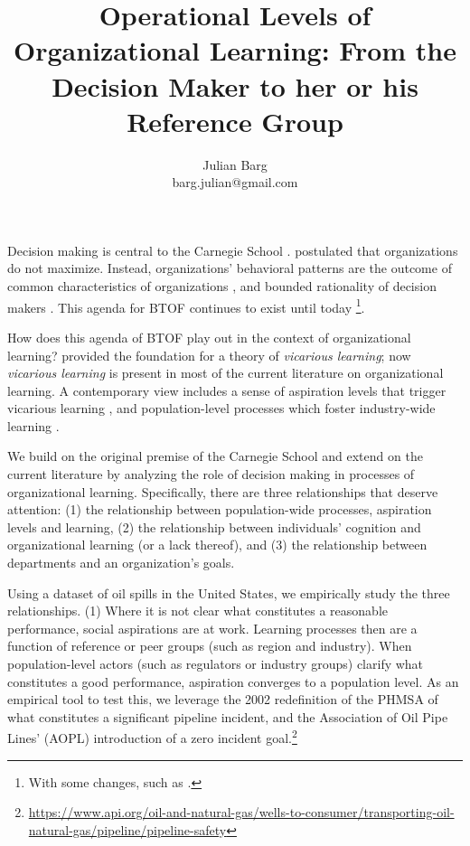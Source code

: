 \documentclass[12pt, man, natbib]{apa6}
\title{Operational Levels of Organizational Learning: From the Decision Maker to her or his Reference Group}
\author{Julian Barg\\barg.julian@gmail.com}
\affiliation{Ivey Business School}
\begin{document}
\maketitle

\singlespacing

\section{}	
	Decision making is central to the Carnegie School \citep{Gavetti2012}. \citet{Cyert1963} postulated that organizations do not maximize. Instead, organizations' behavioral patterns are the outcome of common characteristics of organizations \citep[e.g., the existence of routines or performance programs, see][]{March1958}, and bounded rationality of decision makers \citep{Gavetti2012}. This agenda for BTOF continues to exist until today \footnote{With some changes, such as \citet{Levitt1988}.}.
	
	How does this agenda of BTOF play out in the context of organizational learning? \citet{Levitt1988} provided the foundation for a theory of \textit{vicarious learning}; now \textit{vicarious learning} is present in most of the current literature on organizational learning. A contemporary view includes a sense of aspiration levels that trigger vicarious learning \citep{Baum2007}, and population-level processes which foster industry-wide learning \citep{Madsen2018}.
	
	We build on the original premise of the Carnegie School and extend on the current literature by analyzing the role of decision making in processes of organizational learning. Specifically, there are three relationships that deserve attention: (1) the relationship between population-wide processes, aspiration levels and learning, (2) the relationship between individuals' cognition and organizational learning (or a lack thereof), and (3) the relationship between departments and an organization's goals.
	
	Using a dataset of oil spills in the United States, we empirically study the three relationships. (1) Where it is not clear what constitutes a reasonable performance, social aspirations are at work. Learning processes then are a function of reference or peer groups (such as region and industry). When population-level actors (such as regulators or industry groups) clarify what constitutes a good performance, aspiration converges to a population level. As an empirical tool to test this, we leverage the 2002 redefinition of the PHMSA of what constitutes a significant pipeline incident, and the Association of Oil Pipe Lines' (AOPL) introduction of a zero incident goal.\footnote{\url{https://www.api.org/oil-and-natural-gas/wells-to-consumer/transporting-oil-natural-gas/pipeline/pipeline-safety}}
	
\end{document}
